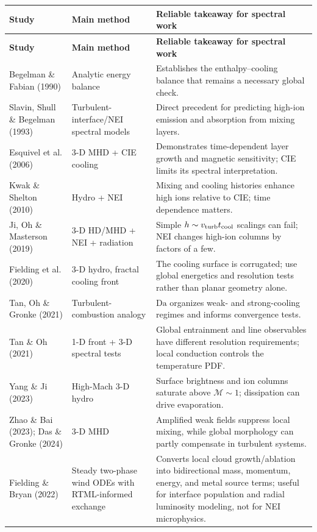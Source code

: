 \documentclass[english,a4paper]{my_memo2}
\newcommand{\tcool}{t_{\rm cool}}
\newcommand{\Da}{\mathrm{Da}}
\begin{document}
\begin{longtable}{p{3.1cm}p{3.2cm}p{7.0cm}}
\toprule
\textbf{Study} & \textbf{Main method} & \textbf{Reliable takeaway for spectral work}\\
\midrule
\endfirsthead
\toprule
\textbf{Study} & \textbf{Main method} & \textbf{Reliable takeaway for spectral work}\\
\midrule
\endhead
Begelman \& Fabian (1990) & Analytic energy balance & Establishes the enthalpy--cooling balance that remains a necessary global check.\\
Slavin, Shull \& Begelman (1993) & Turbulent-interface/NEI spectral models & Direct precedent for predicting high-ion emission and absorption from mixing layers.\\
Esquivel et al. (2006) & 3-D MHD + CIE cooling & Demonstrates time-dependent layer growth and magnetic sensitivity; CIE limits its spectral interpretation.\\
Kwak \& Shelton (2010) & Hydro + NEI & Mixing and cooling histories enhance high ions relative to CIE; time dependence matters.\\
Ji, Oh \& Masterson (2019) & 3-D HD/MHD + NEI + radiation & Simple $h\sim v_{\rm turb}\tcool$ scalings can fail; NEI changes high-ion columns by factors of a few.\\
Fielding et al. (2020) & 3-D hydro, fractal cooling front & The cooling surface is corrugated; use global energetics and resolution tests rather than planar geometry alone.\\
Tan, Oh \& Gronke (2021) & Turbulent-combustion analogy & $\Da$ organizes weak- and strong-cooling regimes and informs convergence tests.\\
Tan \& Oh (2021) & 1-D front + 3-D spectral tests & Global entrainment and line observables have different resolution requirements; local conduction controls the temperature PDF.\\
Yang \& Ji (2023) & High-Mach 3-D hydro & Surface brightness and ion columns saturate above $\mathcal{M}\sim1$; dissipation can drive evaporation.\\
Zhao \& Bai (2023); Das \& Gronke (2024) & 3-D MHD & Amplified weak fields suppress local mixing, while global morphology can partly compensate in turbulent systems.\\
Fielding \& Bryan (2022) & Steady two-phase wind ODEs with RTML-informed exchange & Converts local cloud growth/ablation into bidirectional mass, momentum, energy, and metal source terms; useful for interface population and radial luminosity modeling, not for NEI microphysics.\\
\bottomrule
\end{longtable}
\end{document}
